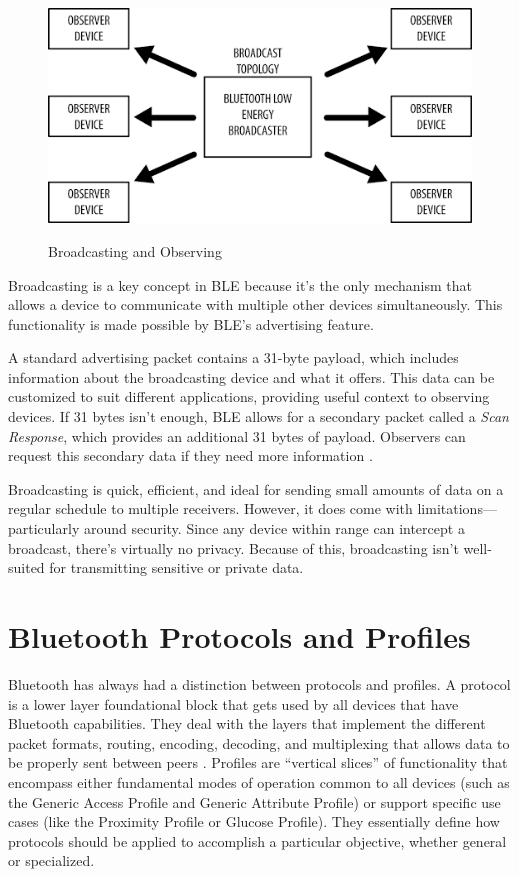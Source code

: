 \begin{figure}[h]
    \caption{Broadcasting and Observing}
    \includegraphics{broadcastobserve.png}
    \label{fig:broadcastobserve}
    \end{figure}

Broadcasting is a key concept in BLE because it’s the only mechanism that allows a device to communicate with multiple other devices simultaneously. This functionality is made possible by BLE’s advertising feature.

A standard advertising packet contains a 31-byte payload, which includes information about the broadcasting device and what it offers. This data can be customized to suit different applications, providing useful context to observing devices. If 31 bytes isn’t enough, BLE allows for a secondary packet called a \textit{Scan Response}, which provides an additional 31 bytes of payload. Observers can request this secondary data if they need more information \cite{gettingstartedwble}.

Broadcasting is quick, efficient, and ideal for sending small amounts of data on a regular schedule to multiple receivers. However, it does come with limitations—particularly around security. Since any device within range can intercept a broadcast, there’s virtually no privacy. Because of this, broadcasting isn’t well-suited for transmitting sensitive or private data.
\section{Bluetooth Protocols and Profiles}

Bluetooth has always had a distinction between protocols and profiles. A protocol is a lower layer foundational block that gets used by all devices that have Bluetooth capabilities. They deal with the layers that implement the different packet formats, routing, encoding, decoding, and multiplexing that allows data to be properly sent between peers \cite{gettingstartedwble}. Profiles are ``vertical slices'' of functionality that encompass either fundamental modes of operation common to all devices (such as the Generic Access Profile and Generic Attribute Profile) or support specific use cases (like the Proximity Profile or Glucose Profile). They essentially define how protocols should be applied to accomplish a particular objective, whether general or specialized.

